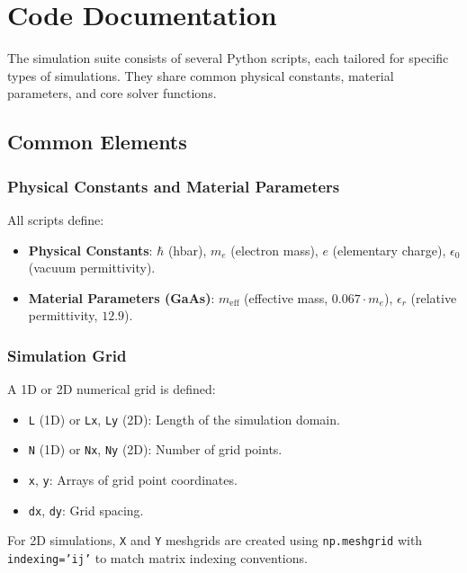\documentclass{article}
\begin{document}
\newpage
\section{Code Documentation}
The simulation suite consists of several Python scripts, each tailored for specific types of simulations. They share common physical constants, material parameters, and core solver functions.

\subsection{Common Elements}
\subsubsection{Physical Constants and Material Parameters}
All scripts define:
\begin{itemize}
	\item \textbf{Physical Constants}: $\hbar$ (hbar), $m_e$ (electron mass), $e$ (elementary charge), $\epsilon_0$ (vacuum permittivity).
	\item \textbf{Material Parameters (GaAs)}: $m_{\text{eff}}$ (effective mass, $0.067 \cdot m_e$), $\epsilon_r$ (relative permittivity, $12.9$).
\end{itemize}

\subsubsection{Simulation Grid}
A 1D or 2D numerical grid is defined:
\begin{itemize}
	\item \texttt{L} (1D) or \texttt{Lx}, \texttt{Ly} (2D): Length of the simulation domain.
	\item \texttt{N} (1D) or \texttt{Nx}, \texttt{Ny} (2D): Number of grid points.
	\item \texttt{x}, \texttt{y}: Arrays of grid point coordinates.
	\item \texttt{dx}, \texttt{dy}: Grid spacing.
\end{itemize}
For 2D simulations, \texttt{X} and \texttt{Y} meshgrids are created using \texttt{np.meshgrid} with \texttt{indexing='ij'} to match matrix indexing conventions.
\end{document}
